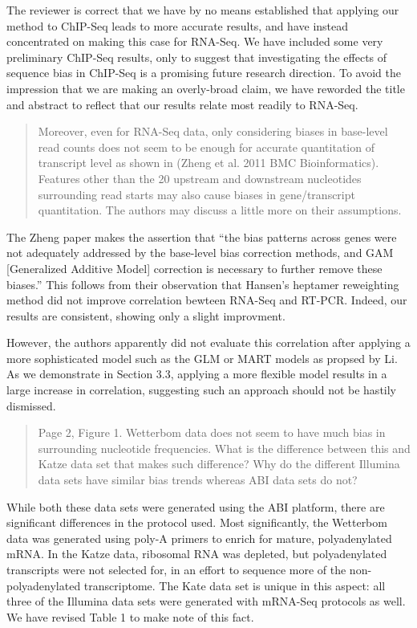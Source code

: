 \documentclass{article}
\begin{document}
The reviewer is correct that we have by no means established that applying our
method to ChIP-Seq leads to more accurate results, and have instead concentrated
on making this case for RNA-Seq. We have included some very preliminary ChIP-Seq
results, only to suggest that investigating the effects of sequence bias in
ChIP-Seq is a promising future research direction. To avoid the impression that
we are making an overly-broad claim, we have reworded the title and abstract to
reflect that our results relate most readily to RNA-Seq.


\begin{quote}
Moreover, even for RNA-Seq data, only considering biases in base-level read
counts does not seem to be enough for accurate quantitation of transcript level
as shown in (Zheng et al. 2011 BMC Bioinformatics). Features other than the 20
upstream and downstream nucleotides surrounding read starts may also cause
biases in gene/transcript quantitation. The authors may discuss a little more on
their assumptions.
\end{quote}

The Zheng paper makes the assertion that ``the bias patterns across genes were
not adequately addressed by the base-level bias correction methods, and GAM
[Generalized Additive Model] correction is necessary to further remove these
biases.'' This follows from their observation that Hansen's heptamer reweighting
method did not improve correlation bewteen RNA-Seq and RT-PCR. Indeed, our
results are consistent, showing only a slight improvment.

However, the authors apparently did not evaluate this correlation after applying
a more sophisticated model such as the GLM or MART models as propsed by Li. As
we demonstrate in Section 3.3, applying a more flexible model results in a large
increase in correlation, suggesting such an approach should not be hastily
dismissed.


\begin{quote}
Page 2, Figure 1. Wetterbom data does not seem to have much bias in surrounding
nucleotide frequencies. What is the difference between this and Katze data set
that makes such difference? Why do the different Illumina data sets have similar
bias trends whereas ABI data sets do not?
\end{quote}

While both these data sets were generated using the ABI platform, there are
significant differences in the protocol used. Most significantly, the Wetterbom
data was generated using poly-A primers to enrich for mature, polyadenylated
mRNA. In the Katze data, ribosomal RNA was depleted, but polyadenylated
transcripts were not selected for, in an effort to sequence more of the
non-polyadenylated transcriptome. The Kate data set is unique in this aspect:
all three of the Illumina data sets were generated with mRNA-Seq protocols as
well.  We have revised Table 1 to make note of this fact.
\end{document}
